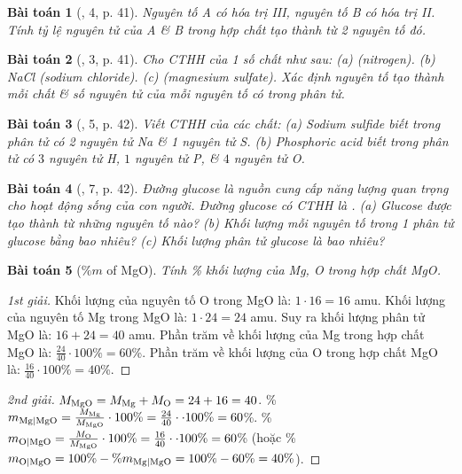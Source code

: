 \documentclass{article}
\newtheorem{baitoan}{Bài toán}
\begin{document}
\begin{baitoan}[\cite{SGK_KHTN_7_Canh_Dieu}, 4, p. 41]
	Nguyên tố A có hóa trị III, nguyên tố B có hóa trị II. Tính tỷ lệ nguyên tử của A \& B trong hợp chất tạo thành từ 2 nguyên tố đó.
\end{baitoan}

\begin{baitoan}[\cite{SGK_KHTN_7_Canh_Dieu}, 3, p. 41]
	Cho CTHH của 1 số chất như sau: (a) \emph{} (nitrogen). (b) \emph{NaCl} (sodium chloride). (c) \emph{} (magnesium sulfate). Xác định nguyên tố tạo thành mỗi chất \& số nguyên tử của mỗi nguyên tố có trong phân tử.
\end{baitoan}

\begin{baitoan}[\cite{SGK_KHTN_7_Canh_Dieu}, 5, p. 42]
	Viết CTHH của các chất: (a) Sodium sulfide biết trong phân tử có 2 nguyên tử \emph{Na} \& 1 nguyên tử \emph{S}. (b) Phosphoric acid biết trong phân tử có $3$ nguyên tử \emph{H}, $1$ nguyên tử \emph{P}, \& $4$ nguyên tử \emph{O}.
\end{baitoan}

\begin{baitoan}[\cite{SGK_KHTN_7_Canh_Dieu}, 7, p. 42]
	Đường glucose là nguồn cung cấp năng lượng quan trọng cho hoạt động sống của con người. Đường glucose có CTHH là \emph{}. (a) Glucose được tạo thành từ những nguyên tố nào? (b) Khối lượng mỗi nguyên tố trong 1 phân tử glucose bằng bao nhiêu? (c) Khối lượng phân tử glucose là bao nhiêu?
\end{baitoan}

\begin{baitoan}[\%$m$ of MgO]
	Tính \% khối lượng của \emph{Mg, O} trong hợp chất \emph{MgO}.
\end{baitoan}

\begin{proof}[1st giải]
	Khối lượng của nguyên tố O trong MgO là: $1\cdot16 = 16$ amu. Khối lượng của nguyên tố Mg trong MgO là: $1\cdot24 = 24$ amu. Suy ra khối lượng phân tử MgO là: $16 + 24 = 40$ amu. Phần trăm về khối lượng của Mg trong hợp chất MgO là: $\frac{24}{40}\cdot100\% = 60$\%. Phần trăm về khối lượng của O trong hợp chất MgO là: $\frac{16}{40}\cdot100\% = 40$\%.
\end{proof}

\begin{proof}[2nd giải]
	$M_{\rm MgO} = M_{\rm Mg} + M_{\rm O} = 24 + 16 = 40$. \%$m_{\rm Mg|MgO} = \frac{M_{\rm Mg}}{M_{\rm MgO}}\cdot100\% = \frac{24}{40}\cdot\cdot100\% = 60$\%. \%$m_{\rm O|MgO} = \frac{M_{\rm O}}{M_{\rm MgO}}\cdot100\% = \frac{16}{40}\cdot\cdot100\% = 60$\% (hoặc \%$m_{\rm O|MgO} = 100\% - \%m_{\rm Mg|MgO} = 100\% - 60\% = 40\%$).
\end{proof}
\end{document}
